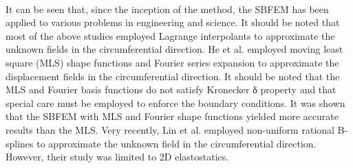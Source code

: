 \paragraph{}
It can be seen that, since the inception of the method, the SBFEM has been applied to various problems in engineering and science.
It should be noted that most of the above studies employed Lagrange interpolants to approximate the unknown fields in the circumferential direction. He et al.
\citep{HE201228,HE2014152} employed moving least square (MLS) shape functions and Fourier series expansion to approximate the displacement fields in the circumferential direction.
It should be noted that the MLS and Fourier basis functions do not satisfy Kronecker δ property and that special care must be employed to enforce the boundary conditions.
It was shown that the SBFEM with MLS and Fourier shape functions yielded more accurate results than the MLS.
Very recently, Lin et al.\citep{Lin2014} employed non-uniform rational B-splines to approximate the unknown field in the circumferential direction.
However, their study was limited to 2D elastostatics.
